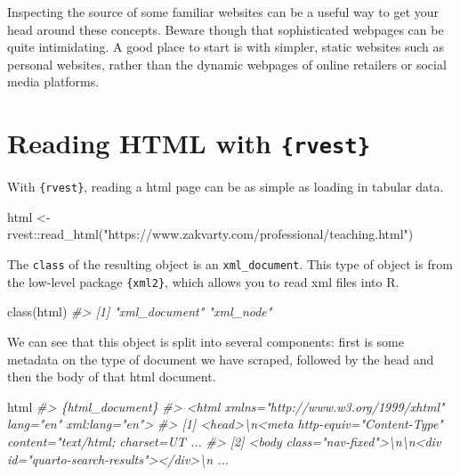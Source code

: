 \documentclass[
  12pt,
]{book}
\newenvironment{Shaded}{\begin{snugshade}}{\end{snugshade}}
\newcommand{\CommentTok}[1]{\textcolor[rgb]{0.56,0.35,0.01}{\textit{#1}}}
\newcommand{\FunctionTok}[1]{\textcolor[rgb]{0.00,0.00,0.00}{#1}}
\newcommand{\NormalTok}[1]{#1}
\newcommand{\OtherTok}[1]{\textcolor[rgb]{0.56,0.35,0.01}{#1}}
\newcommand{\SpecialCharTok}[1]{\textcolor[rgb]{0.00,0.00,0.00}{#1}}
\newcommand{\StringTok}[1]{\textcolor[rgb]{0.31,0.60,0.02}{#1}}
\begin{document}
Inspecting the source of some familiar websites can be a useful way to get your head around these concepts. Beware though that sophisticated webpages can be quite intimidating. A good place to start is with simpler, static websites such as personal websites, rather than the dynamic webpages of online retailers or social media platforms.

\hypertarget{reading-html-with-rvest}{%
\section{\texorpdfstring{Reading HTML with \texttt{\{rvest\}}}{Reading HTML with \{rvest\}}}\label{reading-html-with-rvest}}

With \texttt{\{rvest\}}, reading a html page can be as simple as loading in tabular data.

\begin{Shaded}
\begin{Highlighting}[]
\NormalTok{html }\OtherTok{\textless{}{-}}\NormalTok{ rvest}\SpecialCharTok{::}\FunctionTok{read\_html}\NormalTok{(}\StringTok{"https://www.zakvarty.com/professional/teaching.html"}\NormalTok{)}
\end{Highlighting}
\end{Shaded}

The \texttt{class} of the resulting object is an \texttt{xml\_document}. This type of object is from the low-level package \texttt{\{xml2\}}, which allows you to read xml files into R.

\begin{Shaded}
\begin{Highlighting}[]
\FunctionTok{class}\NormalTok{(html)}
\CommentTok{\#\textgreater{} [1] "xml\_document" "xml\_node"}
\end{Highlighting}
\end{Shaded}

We can see that this object is split into several components: first is some metadata on the type of document we have scraped, followed by the head and then the body of that html document.

\begin{Shaded}
\begin{Highlighting}[]
\NormalTok{html}
\CommentTok{\#\textgreater{} \{html\_document\}}
\CommentTok{\#\textgreater{} \textless{}html xmlns="http://www.w3.org/1999/xhtml" lang="en" xml:lang="en"\textgreater{}}
\CommentTok{\#\textgreater{} [1] \textless{}head\textgreater{}\textbackslash{}n\textless{}meta http{-}equiv="Content{-}Type" content="text/html; charset=UT ...}
\CommentTok{\#\textgreater{} [2] \textless{}body class="nav{-}fixed"\textgreater{}\textbackslash{}n\textbackslash{}n\textless{}div id="quarto{-}search{-}results"\textgreater{}\textless{}/div\textgreater{}\textbackslash{}n   ...}
\end{Highlighting}
\end{Shaded}
\end{document}
